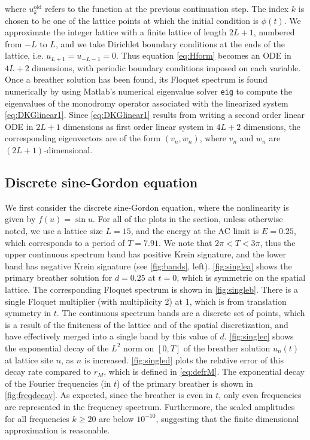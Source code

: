 \documentclass[12pt,reqno]{amsart}
\theoremstyle{definition}
\begin{document}
where $u_k^\text{old}$ refers to the function at the previous continuation step. The index $k$ is chosen to be one of the lattice points at which the initial condition is $\phi(t)$. We approximate the integer lattice with a finite lattice of length $2L+1$, numbered from $-L$ to $L$, and we take Dirichlet boundary conditions at the ends of the lattice, i.e. $u_{L+1} = u_{-L-1} = 0$. Thus equation \cref{eq:Hform} becomes an ODE in $4L+2$ dimensions, with periodic boundary conditions imposed on each variable. Once a breather solution has been found, its Floquet spectrum is found numerically by using Matlab's numerical eigenvalue solver \texttt{eig} to compute the eigenvalues of the monodromy operator associated with the linearized system \cref{eq:DKGlinear1}. Since \cref{eq:DKGlinear1} results from writing a second order linear ODE in $2L+1$ dimensions as first order linear system in $4L+2$ dimensions, the corresponding eigenvectors are of the form $(v_n, w_n)$, where $v_n$ and $w_n$ are $(2L+1)$-dimensional.

\subsection{Discrete sine-Gordon equation}

We first consider the discrete sine-Gordon equation, where the nonlinearity is given by $f(u) = \sin u$. For all of the plots in the section, unless otherwise noted, we use a lattice size $L = 15$, and the energy at the AC limit is $E = 0.25$, which corresponds to a period of $T = 7.91$. We note that $2 \pi < T < 3 \pi$, thus the upper continuous spectrum band has positive Krein signature, and the lower band has negative Krein signature (see \cref{fig:bands}, left).
\cref{fig:singlea} shows the primary breather solution for $d = 0.25$ at $t = 0$, which is symmetric on the spatial lattice. The corresponding Floquet spectrum is shown in \cref{fig:singleb}. There is a single Floquet multiplier (with multiplicity 2) at 1, which is from translation symmetry in $t$. The continuous spectrum bands are a discrete set of points, which is a result of the finiteness
of the lattice and of the spatial discretization, and have effectively merged into a single band by this value of $d$. 
\cref{fig:singlec} shows the exponential decay of the $L^2$ norm on $[0,T]$ of the breather solution $u_n(t)$ at lattice site $n$, as $n$ is increased. \cref{fig:singled} plots the relative error of this decay rate compared to $r_M$, which is defined in \cref{eq:defrM}. The exponential decay of the Fourier frequencies (in $t$) of the primary breather is shown in \cref{fig:freqdecay}. As expected, since the breather is even in $t$, only even frequencies are represented in the frequency spectrum. Furthermore, the scaled amplitudes for all frequencies $k\geq 20$ are below $10^{-10}$, suggesting that the finite dimensional approximation is reasonable.
\end{document}
